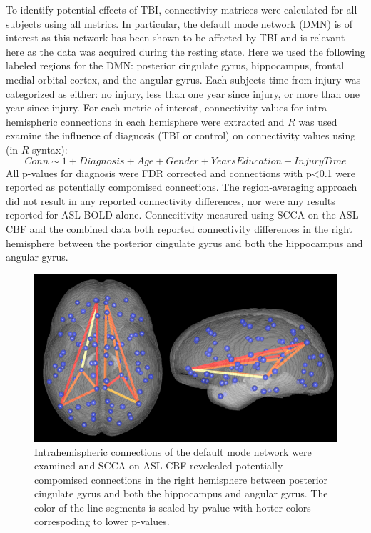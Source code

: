 \documentclass{llncs}
\begin{document}
 To identify potential effects of TBI, connectivity matrices were calculated for all subjects using all metrics. In particular, the default mode network (DMN) is of interest as this network has been shown to be affected by TBI \cite{Johnson2012} and is relevant here as the data was acquired during the resting state. Here we used the following labeled regions for the DMN: posterior cingulate gyrus, hippocampus, frontal medial orbital cortex, and the angular gyrus. Each subjects time from injury was categorized as either: no injury, less than one year since injury, or more than one year since injury. For each metric of interest, connectivity values for intra-hemispheric connections in each hemisphere were extracted and $R$ was used examine the influence of diagnosis (TBI or control) on connectivity values using (in $R$ syntax):
\begin{equation}
Conn \sim 1 + Diagnosis + Age + Gender + YearsEducation + InjuryTime
\end{equation}
All p-values for diagnosis were FDR corrected and connections with p<0.1 were reported as potentially compomised connections. The region-averaging approach did not result in any reported connectivity differences, nor were any results reported for ASL-BOLD alone. Connecitivity measured using SCCA on the ASL-CBF and the combined data both reported connectivity differences in the right hemisphere between the posterior cingulate gyrus and both the hippocampus and angular gyrus.
 
\begin{figure}[tb]
\begin{center}
\includegraphics[width=0.5\linewidth]{dfm.png} 
\caption{Intrahemispheric connections of the default mode network were examined and SCCA on ASL-CBF revelealed potentially compomised connections in the right hemisphere between posterior cingulate gyrus and both the hippocampus and angular gyrus. The color of the line segments is scaled by pvalue with hotter colors correspoding to lower p-values. }
\label{fig:dfm}
\end{center}
\end{figure}
\end{document}

